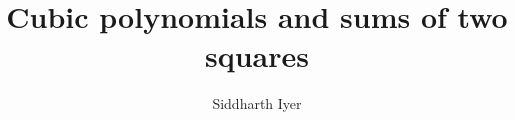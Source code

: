 \documentclass[12pt]{amsart}
\newcommand{\1}{\mathmybb{1}}
\begin{document}
\def\NmQR{N(m;Q,R)}
\def\VmQR{\cV(m;Q,R)}

\def\Xm{\cX_{p,m}}

\def \A {{\mathbb A}}
\def \B {{\mathbb A}}
\def \C {{\mathbb C}}
\def \F {{\mathbb F}}
\def \G {{\mathbb G}}
\def \L {{\mathbb L}}
\def \K {{\mathbb K}}
\def \N {{\mathbb N}}
\def \PP {{\mathbb P}}
\def \Q {{\mathbb Q}}
\def \R {{\mathbb R}}
\def \Z {{\mathbb Z}}
\def \fS{\mathfrak S}
\def \fB{\mathfrak B}

\def\Fq{\F_q}
\def\Fqr{\F_{q^r}} 
\def\ovFq{\overline{\F_q}}
\def\ovFp{\overline{\F_p}}
\def\GL{\operatorname{GL}}
\def\SL{\operatorname{SL}}
\def\PGL{\operatorname{PGL}}
\def\PSL{\operatorname{PSL}}
\def\li{\operatorname{li}}
\def\sym{\operatorname{sym}}

\def\Mob{M{\"o}bius }

\def\fF{\EuScript{F}}
\def\M{\mathsf {M}}
\def\T{\mathsf {T}}


\def\e{{\mathbf{\,e}}}
\def\ep{{\mathbf{\,e}}_p}
\def\eq{{\mathbf{\,e}}_q}

\def\\{\cr}
\def\({\left(}
\def\){\right)}

\def\<{\left(\!\!\left(}
\def\>{\right)\!\!\right)}
\def\fl#1{\left\lfloor#1\right\rfloor}
\def\rf#1{\left\lceil#1\right\rceil}

\def\Tr{{\mathrm{Tr}}}
\def\Nm{{\mathrm{Nm}}}
\def\Im{{\mathrm{Im}}}

\def \oF {\overline \F}

\newcommand{\pfrac}[2]{{\left(\frac{#1}{#2}\right)}}


\def \Prob{{\mathrm {}}}
\def\e{\mathbf{e}}
\def\ep{{\mathbf{\,e}}_p}
\def\epp{{\mathbf{\,e}}_{p^2}}
\def\em{{\mathbf{\,e}}_m}

\def\Res{\mathrm{Res}}
\def\Orb{\mathrm{Orb}}

\def\vec#1{\mathbf{#1}}
\def \va{\vec{a}}
\def \vb{\vec{b}}
\def \vh{\vec{h}}
\def \vk{\vec{k}}
\def \vs{\vec{s}}
\def \vu{\vec{u}}
\def \vv{\vec{v}}
\def \vz{\vec{z}}
\def\flp#1{{\left\langle#1\right\rangle}_p}
\def\T {\mathsf {T}}

\def\sfG {\mathsf {G}}
\def\sfK {\mathsf {K}}

\def\mand{\qquad\mbox{and}\qquad}


\title[Cubic polynomials and sums of two squares]
{Cubic polynomials and sums of two squares}

\author[Siddharth Iyer] {Siddharth Iyer}
\address{School of Mathematics and Statistics, University of New South Wales, Sydney, NSW 2052, Australia}
\end{document}
